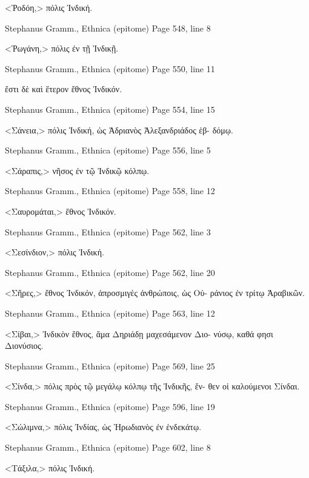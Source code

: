 \documentclass[12pt,letterpaper,twoside,final]{memoir}
\begin{document}
\begin{greek}
<Ῥοδόη,> πόλις Ἰνδική. 



Stephanus Gramm., Ethnica (epitome) 
Page 548, line 8

<Ῥωγάνη,> πόλις ἐν τῇ Ἰνδικῇ. 



Stephanus Gramm., Ethnica (epitome) 
Page 550, line 11

                                                     ἔστι δὲ καὶ 
ἕτερον ἔθνος Ἰνδικόν. 



Stephanus Gramm., Ethnica (epitome) 
Page 554, line 15

<Σάνεια,> πόλις Ἰνδική, ὡς Ἀδριανὸς Ἀλεξανδριάδος ἑβ-
δόμῳ. 



Stephanus Gramm., Ethnica (epitome) 
Page 556, line 5

<Σάραπις,> νῆσος ἐν τῷ Ἰνδικῷ κόλπῳ. 



Stephanus Gramm., Ethnica (epitome) 
Page 558, line 12

<Σαυρομάται,> ἔθνος Ἰνδικόν. 



Stephanus Gramm., Ethnica (epitome) 
Page 562, line 3

<Σεσίνδιον,> πόλις Ἰνδική. 



Stephanus Gramm., Ethnica (epitome) 
Page 562, line 20

<Σῆρες,> ἔθνος Ἰνδικόν, ἀπροσμιγὲς ἀνθρώποις, ὡς Οὐ-
ράνιος ἐν τρίτῳ Ἀραβικῶν. 



Stephanus Gramm., Ethnica (epitome) 
Page 563, line 12

<Σίβαι,> Ἰνδικὸν ἔθνος, ἅμα Δηριάδῃ μαχεσάμενον Διο-
νύσῳ, καθά φησι Διονύσιος. 



Stephanus Gramm., Ethnica (epitome) 
Page 569, line 25

<Σίνδα,> πόλις πρὸς τῷ μεγάλῳ κόλπῳ τῆς Ἰνδικῆς, ἔν-
θεν οἱ καλούμενοι Σίνδαι. 



Stephanus Gramm., Ethnica (epitome) 
Page 596, line 19

<Σώλιμνα,> πόλις Ἰνδίας, ὡς Ἡρωδιανὸς ἐν ἑνδεκάτῳ. 



Stephanus Gramm., Ethnica (epitome) 
Page 602, line 8

<Τάξιλα,> πόλις Ἰνδική. 




\end{greek}
\end{document}
